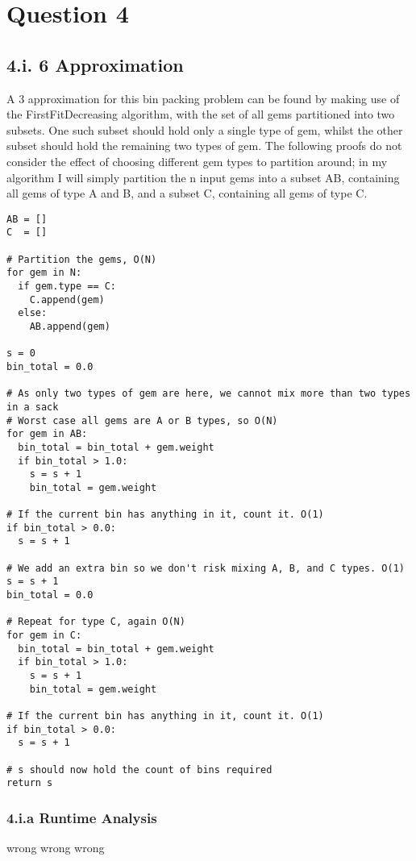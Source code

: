 \documentclass[paper=a4, fontsize=12pt]{article}
\begin{document}
\section{Question 4}

\subsection{4.i. 6 Approximation}

A 3 approximation for this bin packing problem can be found by making use of the FirstFitDecreasing algorithm, with the set of all gems partitioned into two subsets. One such subset should hold only a single type of gem, whilst the other subset should hold the remaining two types of gem. The following proofs do not consider the effect of choosing different gem types to partition around; in my algorithm I will simply partition the n input gems into a subset AB, containing all gems of type A and B, and a subset C, containing all gems of type C.

\begin{verbatim}
AB = []
C  = []

# Partition the gems, O(N)
for gem in N:
  if gem.type == C:
    C.append(gem)
  else:
    AB.append(gem)

s = 0
bin_total = 0.0

# As only two types of gem are here, we cannot mix more than two types in a sack
# Worst case all gems are A or B types, so O(N)
for gem in AB:
  bin_total = bin_total + gem.weight
  if bin_total > 1.0:
    s = s + 1
    bin_total = gem.weight

# If the current bin has anything in it, count it. O(1)
if bin_total > 0.0:
  s = s + 1

# We add an extra bin so we don't risk mixing A, B, and C types. O(1)
s = s + 1
bin_total = 0.0

# Repeat for type C, again O(N)
for gem in C:
  bin_total = bin_total + gem.weight
  if bin_total > 1.0:
    s = s + 1
    bin_total = gem.weight

# If the current bin has anything in it, count it. O(1)
if bin_total > 0.0:
  s = s + 1

# s should now hold the count of bins required
return s
\end{verbatim}

\subsubsection{4.i.a Runtime Analysis}
wrong wrong wrong
\end{document}

